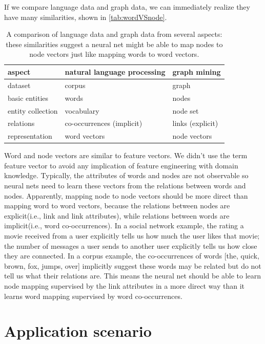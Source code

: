 \documentclass{article}
\begin{document}
If we compare language data and graph data, we can immediately realize they 
have many similarities, shown in \autoref{tab:wordVSnode}.
\begin{table}[h]
	\centering
	\begin{tabularx}{\textwidth}{ |X|X|X| } \hline
		aspect  & natural language processing & graph mining \\ \hline
		dataset & corpus & graph \\ \hline
		basic entities & words & nodes \\ \hline
		entity collection & vocabulary & node set \\ \hline
		relations & co-occurrences (implicit) & links (explicit) \\ \hline
		representation & word vectors & node vectors \\ \hline
	\end{tabularx}
	\caption{A comparison of language data and graph data from 
		several aspects: these similarities suggest a neural net might be able 
		to map nodes to node vectors just like mapping words to word vectors.}
	\label{tab:wordVSnode}
\end{table}
Word and node vectors are similar to feature vectors. We didn't use the term 
feature vector to avoid any implication of feature engineering with domain 
knowledge. Typically, the attributes of words and nodes are not observable so 
neural nets need to learn these vectors from the relations between words and 
nodes.
Apparently, mapping node to node vectors should be more direct than mapping 
word to word vectors, because the relations between nodes are explicit(i.e., 
link and link attributes), while relations between words are implicit(i.e., 
word co-occurrences). In a social network example, the rating a movie received 
from a user explicitly tells us how much the user likes that movie; the number 
of messages a user sends to another user explicitly tells us how close they are 
connected. In a corpus example, the co-occurrences of words [the, quick, brown, 
fox, jumps, over] implicitly suggest these words may be related but do not tell 
us what their relations are. This means the neural net should be able to learn 
node mapping supervised by the link attributes in a more direct way than it 
learns word mapping supervised by word co-occurrences.

\section{Application scenario}
\end{document}
